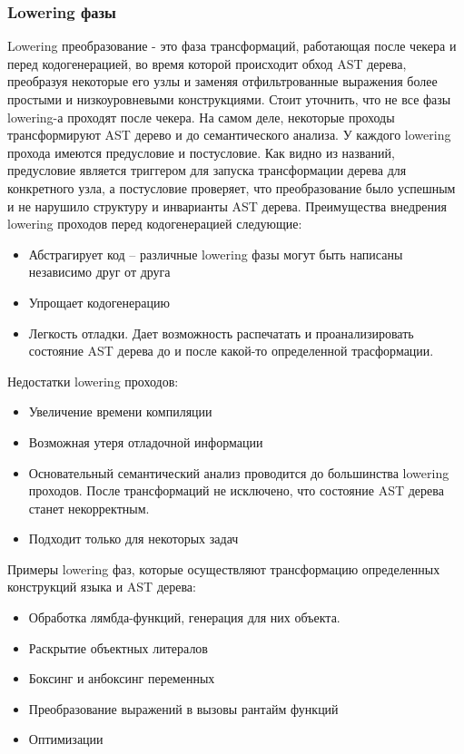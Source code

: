 \subsubsection{Lowering фазы}

Lowering преобразование - это фаза трансформаций, работающая после чекера и перед кодогенерацией,
во время которой происходит обход AST дерева, преобразуя некоторые его узлы и заменяя отфильтрованные выражения более
простыми и низкоуровневыми конструкциями.
Стоит уточнить, что не все фазы lowering-а проходят после чекера.
На самом деле, некоторые проходы трансформируют AST дерево и до семантического анализа.
У каждого lowering прохода имеются предусловие и постусловие.
Как видно из названий, предусловие является триггером для запуска трансформации дерева для конкретного узла, а
постусловие проверяет, что преобразование было успешным и не нарушило структуру и инварианты AST дерева.
Преимущества внедрения lowering проходов перед кодогенерацией следующие:

\begin{itemize}[left=2em]
    \item Абстрагирует код – различные lowering фазы могут быть написаны независимо друг от друга
    \item Упрощает кодогенерацию
    \item Легкость отладки.
    Дает возможность распечатать и проанализировать состояние AST дерева до и после какой-то определенной трасформации.
\end{itemize}

Недостатки lowering проходов:

\begin{itemize}[left=2em]
    \item Увеличение времени компиляции
    \item Возможная утеря отладочной информации
    \item Основательный семантический анализ проводится до большинства lowering проходов.
    После трансформаций не исключено, что состояние AST дерева станет некорректным.
    \item Подходит только для некоторых задач
\end{itemize}

Примеры lowering фаз, которые осуществляют трансформацию определенных конструкций языка и AST дерева:

\begin{itemize}[left=2em]
    \item Обработка лямбда-функций, генерация для них объекта.
    \item Раскрытие объектных литералов
    \item Боксинг и анбоксинг переменных
    \item Преобразование выражений в вызовы рантайм функций
    \item Оптимизации
\end{itemize}

